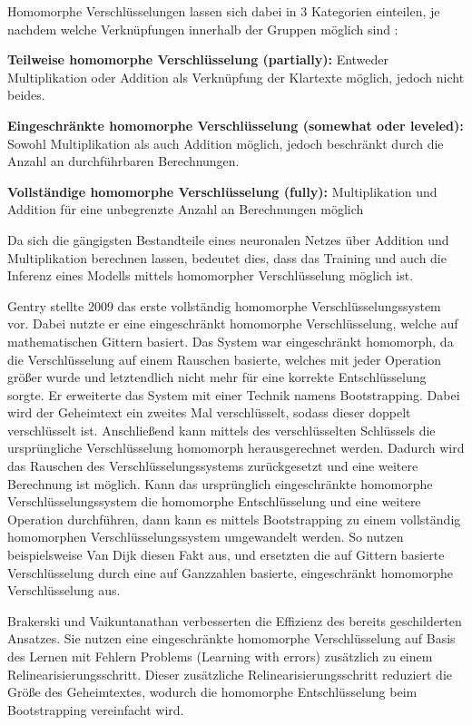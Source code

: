 Homomorphe Verschlüsselungen lassen sich dabei in 3 Kategorien einteilen, je nachdem welche Verknüpfungen innerhalb der Gruppen möglich sind \cite{P-42}:
\begin{compactitem}
\item \textbf{Teilweise homomorphe Verschlüsselung (partially):} Entweder Multiplikation oder Addition als Verknüpfung der Klartexte möglich, jedoch nicht beides.
\item \textbf{Eingeschränkte homomorphe Verschlüsselung (somewhat oder leveled):} Sowohl Multiplikation als auch Addition möglich, jedoch beschränkt durch die Anzahl an durchführbaren Berechnungen. 
\item \textbf{Vollständige homomorphe Verschlüsselung (fully):} Multiplikation und Addition für eine unbegrenzte Anzahl an Berechnungen möglich
\end{compactitem}

Da sich die gängigsten Bestandteile eines neuronalen Netzes über Addition und Multiplikation berechnen lassen, bedeutet dies, dass das Training und auch die Inferenz eines Modells mittels homomorpher Verschlüsselung möglich ist. 

Gentry \cite{P-40} stellte 2009 das erste vollständig homomorphe Verschlüsselungssystem vor.
Dabei nutzte er eine eingeschränkt homomorphe Verschlüsselung, welche auf mathematischen Gittern basiert.
Das System war eingeschränkt homomorph, da die Verschlüsselung auf einem Rauschen basierte, welches mit jeder Operation größer wurde und letztendlich nicht mehr für eine korrekte Entschlüsselung sorgte.
Er erweiterte das System mit einer Technik namens Bootstrapping.
Dabei wird der Geheimtext ein zweites Mal verschlüsselt, sodass dieser doppelt verschlüsselt ist.
Anschließend kann mittels des verschlüsselten Schlüssels die ursprüngliche Verschlüsselung homomorph herausgerechnet werden. 
Dadurch wird das Rauschen des Verschlüsselungssystems zurückgesetzt und eine weitere Berechnung ist möglich. 
Kann das ursprünglich eingeschränkte homomorphe Verschlüsselungssystem die homomorphe Entschlüsselung und eine weitere Operation durchführen, dann kann es mittels Bootstrapping zu einem vollständig homomorphen Verschlüsselungssystem umgewandelt werden.
So nutzen beispielsweise Van Dijk \etal \cite{P-100} diesen Fakt aus, und ersetzten die auf Gittern basierte Verschlüsselung durch eine auf Ganzzahlen basierte, eingeschränkt homomorphe Verschlüsselung aus. 

Brakerski und Vaikuntanathan \cite{P-101} verbesserten die Effizienz des bereits geschilderten Ansatzes.
Sie nutzen eine eingeschränkte homomorphe Verschlüsselung auf Basis des Lernen mit Fehlern Problems (Learning with errors) zusätzlich zu einem Relinearisierungsschritt.
Dieser zusätzliche Relinearisierungsschritt reduziert die Größe des Geheimtextes, wodurch die homomorphe Entschlüsselung beim Bootstrapping vereinfacht wird.

